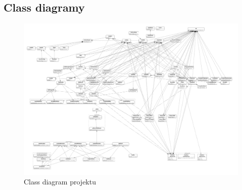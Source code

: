 \documentclass[a4paper,12pt]{report}
\begin{document}
\pagebreak
\sloppy
\begin{landscape}
\section{Class diagramy}
\label{sec:CD}
\begin{figure}[hbt!]
	\includegraphics[width=1\linewidth, height=0.55\linewidth]{img/ClassDiagramy/src_diagram_export.png}
	\caption{Class diagram projektu}
	\label{fig:enter-label}
\end{figure}
\pagebreak


\end{landscape}
\end{document}
